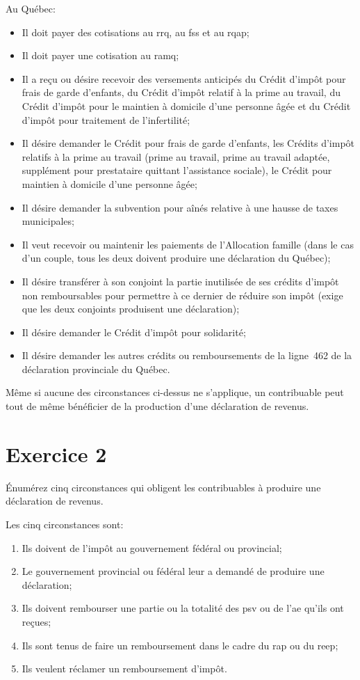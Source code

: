Au Québec:
\qc
\begin{itemize}
	\item Il doit payer des cotisations au \acrfull{rrq}, au \acrfull{fss} et au \acrfull{rqap};
	\item Il doit payer une cotisation au \acrfull{ramq};
	\item Il a reçu ou désire recevoir des versements anticipés du Crédit d'impôt pour frais de garde d'enfants, du Crédit d'impôt relatif à la prime au travail, du Crédit d'impôt pour le maintien à domicile d'une personne âgée et du Crédit d'impôt pour traitement de l'infertilité;
	\item Il désire demander le Crédit pour frais de garde d'enfants, les Crédits d'impôt relatifs à la prime au travail (prime au travail, prime au travail adaptée, supplément pour prestataire quittant l'assistance sociale), le Crédit pour maintien à domicile d'une personne âgée;
	\item Il désire demander la subvention pour aînés relative à une hausse de taxes municipales;
	\item Il veut recevoir ou maintenir les paiements de l'Allocation famille (dans le cas d'un couple, tous les deux doivent produire une déclaration du Québec);
	\item Il désire transférer à son conjoint la partie inutilisée de ses crédits d'impôt non remboursables pour permettre à ce dernier de réduire son impôt (exige que les deux conjoints produisent une déclaration);
	\item Il désire demander le Crédit d'impôt pour solidarité;
	\item Il désire demander les autres crédits ou remboursements de la ligne~462 de la déclaration provinciale du Québec.
\end{itemize}

Même si aucune des circonstances ci-dessus ne s'applique, un contribuable peut tout de même bénéficier de la production d'une déclaration de revenus.



\section{Exercice 2}
\setcounter{question}{0}
\begin{question}
	Énumérez cinq circonstances qui obligent les contribuables à produire une déclaration de revenus.
\end{question}
Les cinq circonstances sont:
\begin{enumerate}
	\item Ils doivent de l'impôt au gouvernement fédéral ou provincial;
	\item Le gouvernement provincial ou fédéral leur a demandé de produire une déclaration;
	\item Ils doivent rembourser une partie ou la totalité des \acrfull{psv} ou de l'\acrfull{ae} qu'ils ont reçues;
	\item Ils sont tenus de faire un remboursement dans le cadre du \acrfull{rap} ou du \acrfull{reep};
	\item Ils veulent réclamer un remboursement d'impôt.
\end{enumerate}

